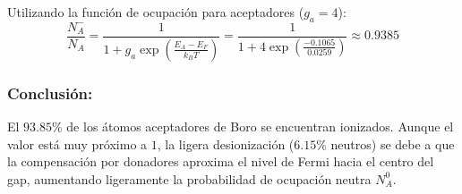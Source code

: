 \begin{problema}
Utilizando la función de ocupación para aceptadores ($g_a = 4$):
\[
\frac{N_A^-}{N_A} = \frac{1}{1 + g_a \exp\left( \frac{E_A - E_F}{k_B T} \right)} = \frac{1}{1 + 4 \exp\left( \frac{-0.1065}{0.0259} \right)} \approx 0.9385
\]

\subsubsection*{Conclusión:} El $93.85\%$ de los átomos aceptadores de Boro se encuentran ionizados. Aunque el valor está muy próximo a $1$, la ligera desionización ($6.15\%$ neutros) se debe a que la compensación por donadores aproxima el nivel de Fermi hacia el centro del gap, aumentando ligeramente la probabilidad de ocupación neutra $N_A^0$.
\end{problema}

